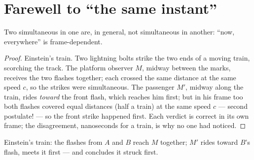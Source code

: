 \section{Farewell to ``the same instant''}

\begin{proposition}\label{prop:g12:special-relativity:simultaneity}
Two  simultaneous in one  are, in general, not
simultaneous in another: ``now, everywhere'' is frame-dependent.
\end{proposition}

\begin{proof}
Einstein's train. Two lightning bolts strike the two ends of a moving
train, scorching the track. The platform observer $M$, midway between the
marks, receives the two flashes together; each crossed the same distance at
the same speed $c$, so the strikes were simultaneous. The passenger $M'$,
midway along the train, rides \emph{toward} the front flash, which reaches
him first; but in his frame too both flashes covered equal distances (half
a train) at the same speed $c$ --- second postulate! --- so the front
strike happened first. Each verdict is correct in its own frame; the
disagreement, nanoseconds for a train, is why no one had noticed.
\end{proof}

\begin{omfigure}

{\small Einstein's train: the flashes from $A$ and $B$ reach $M$ together; $M'$
rides toward $B$'s flash, meets it first --- and concludes it struck first.}
\end{omfigure}

